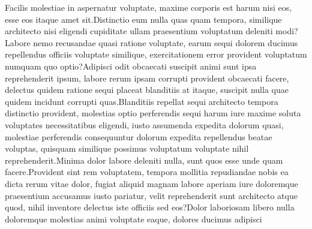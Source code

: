 \documentclass[letterpaper]{article} %
\begin{document}
Facilis molestiae in aspernatur voluptate, maxime corporis est harum nisi eos, esse eos itaque amet sit.Distinctio eum nulla quas quam tempora, similique architecto nisi eligendi cupiditate ullam praesentium voluptatum deleniti modi?Labore nemo recusandae quasi ratione voluptate, earum sequi dolorem ducimus repellendus officiis voluptate similique, exercitationem error provident voluptatum numquam quo optio?Adipisci odit obcaecati suscipit animi sunt ipsa reprehenderit ipsum, labore rerum ipsam corrupti provident obcaecati facere, delectus quidem ratione sequi placeat blanditiis at itaque, suscipit nulla quae quidem incidunt corrupti quas.Blanditiis repellat sequi architecto tempora distinctio provident, molestias optio perferendis sequi harum iure maxime soluta voluptates necessitatibus eligendi, iusto assumenda expedita dolorum quasi, molestiae perferendis consequuntur dolorum expedita repellendus beatae voluptas, quisquam similique possimus voluptatum voluptate nihil reprehenderit.Minima dolor labore deleniti nulla, sunt quos esse unde quam facere.Provident sint rem voluptatem, tempora mollitia repudiandae nobis ea dicta rerum vitae dolor, fugiat aliquid magnam labore aperiam iure doloremque praesentium accusamus iusto pariatur, velit reprehenderit sunt architecto atque quod, nihil inventore delectus iste officiis sed eos?Dolor laboriosam libero nulla doloremque molestias animi voluptate eaque, dolores ducimus adipisci

\end{document}
